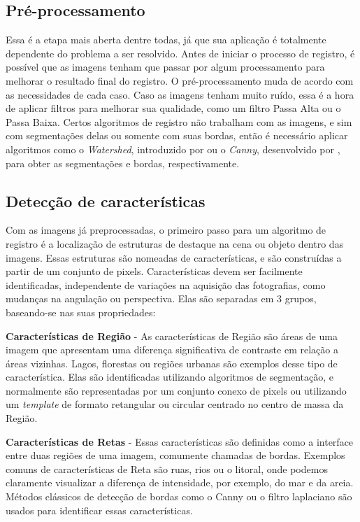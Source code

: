 \subsection{Pré-processamento}
    Essa é a etapa mais aberta dentre todas, já que sua aplicação é totalmente dependente do problema a ser resolvido. 
Antes de iniciar o processo de registro, é possível que as imagens tenham que passar por algum processamento para 
melhorar o resultado final do registro. O pré-processamento muda de acordo com as necessidades de cada caso. Caso as
imagens tenham muito ruído, essa é a hora de aplicar filtros para melhorar sua qualidade, como um filtro Passa Alta ou 
o Passa Baixa. Certos algoritmos de registro não trabalham com as imagens, e sim com segmentações delas ou somente com 
suas bordas, então é necessário aplicar algoritmos como o \textit{Watershed}, introduzido por 
\cite{vincent1991watersheds} ou o \textit{Canny}, desenvolvido por \cite{canny1986computational}, para obter as 
segmentações e bordas, respectivamente.

\subsection{Detecção de características}
\label{sec:dec_corr_carac}

    Com as imagens já preprocessadas, o primeiro passo para um algoritmo de registro é a localização de estruturas de 
destaque na cena ou objeto dentro das imagens. Essas estruturas são nomeadas de características, e são construídas a 
partir de um conjunto de pixels. Características devem ser facilmente identificadas, independente de variações na 
aquisição das fotografias, como mudanças na angulação ou perspectiva. Elas são separadas em 3 grupos, baseando-se nas 
suas propriedades:

\textbf{Características de Região} - As características de Região são áreas de uma imagem que apresentam uma diferença
significativa de contraste em relação a áreas vizinhas. Lagos, florestas ou regiões urbanas são exemplos desse tipo de 
característica. Elas são identificadas utilizando algoritmos de segmentação, e normalmente são representadas por um
conjunto conexo de pixels ou utilizando um \textit{template} de formato retangular ou circular centrado no centro de 
massa da Região.

\textbf{Características de Retas} - Essas características são definidas como a interface entre duas regiões de uma 
imagem, comumente chamadas de bordas. Exemplos comuns de características de Reta são ruas, rios ou o litoral, onde 
podemos claramente visualizar a diferença de intensidade, por exemplo, do mar e da areia. Métodos clássicos de detecção 
de bordas como o Canny ou o filtro laplaciano são usados para identificar essas características.

